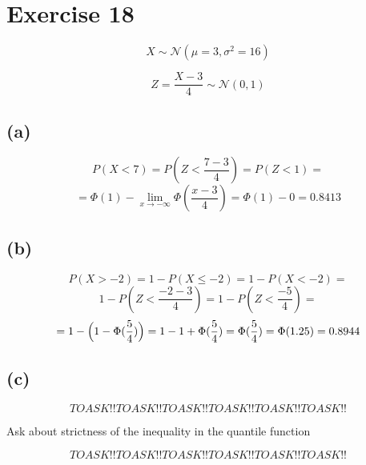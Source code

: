 \documentclass{article}
\begin{document}
\section*{Exercise 18}

\begin{equation*}
    X \sim \mathcal{N}(\mu = 3, \sigma^2 = 16)
\end{equation*}

\begin{equation*}
    Z = \frac{X - 3}{4} \sim \mathcal{N}(0, 1)
\end{equation*}

\subsection*{(a)}

\begin{equation*}
    P(X < 7) = P(Z < \frac{7 - 3}{4}) =  P(Z < 1) = 
\end{equation*}
\begin{equation*}
    = \Phi(1) - \lim_{x \to -\infty}\Phi(\frac{x - 3}{4}) = \Phi(1) - 0 = 0.8413
\end{equation*}


\subsection*{(b)}

\begin{equation*}
    P(X > -2) = 1 - P(X \leq -2) = 1 - P(X < -2) = 
\end{equation*}
\begin{equation*}
    1 - P(Z < \frac{-2 - 3}{4}) = 1 - P(Z < \frac{-5}{4}) = 
\end{equation*}
\begin{equation*}
   = 1 - \Bigl(1 - \Phi(\frac{5}{4})\Bigr) = 1 - 1 + \Phi(\frac{5}{4}) = \Phi(\frac{5}{4}) = \Phi(1.25) = 0.8944
\end{equation*}

\subsection*{(c)}


\begin{equation*}
    TOASK!!TOASK!!TOASK!!TOASK!!TOASK!!TOASK!!
\end{equation*}
\begin{center}
    Ask about strictness of the inequality in the quantile function 
\end{center}
\begin{equation*}
    TOASK!!TOASK!!TOASK!!TOASK!!TOASK!!TOASK!!
\end{equation*}
\end{document}
